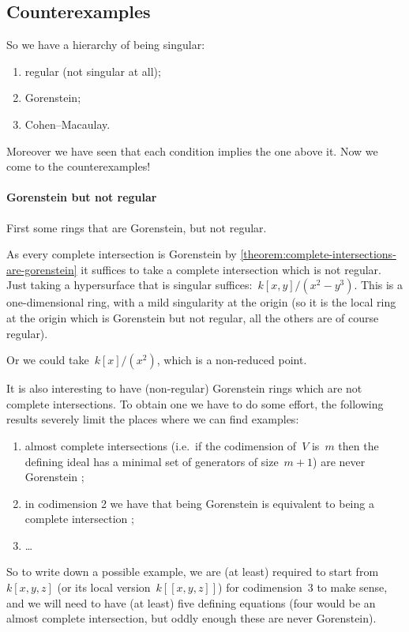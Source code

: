 \documentclass[10pt,a4paper]{article}
\begin{document}
\subsection{Counterexamples}
So we have a hierarchy of being singular:
\begin{enumerate}
  \item regular (not singular at all);
  \item Gorenstein;
  \item Cohen--Macaulay.
\end{enumerate}
Moreover we have seen that each condition implies the one above it. Now we come to the counterexamples!

\paragraph{Gorenstein but not regular}
First some rings that are Gorenstein, but not regular.
\begin{example}
  As every complete intersection is Gorenstein by \cref{theorem:complete-intersections-are-gorenstein} it suffices to take a complete intersection which is not regular. Just taking a hypersurface that is singular suffices:~$k[x,y]/(x^2-y^3)$. This is a one-dimensional ring, with a mild singularity at the origin (so it is the local ring at the origin which is Gorenstein but not regular, all the others are of course regular).
  
  Or we could take~$k[x]/(x^2)$, which is a non-reduced point.
\end{example}
It is also interesting to have (non-regular) Gorenstein rings which are not complete intersections. To obtain one we have to do some effort, the following results severely limit the places where we can find examples:
\begin{enumerate}
  \item almost complete intersections (i.e.\ if the codimension of~$V$ is~$m$ then the defining ideal has a minimal set of generators of size~$m+1$) are never Gorenstein \addreference;
  \item in codimension 2 we have that being Gorenstein is equivalent to being a complete intersection \cite[corollary 21.20]{eisenbud-commutative-algebra};
  \item \ldots
\end{enumerate}
So to write down a possible example, we are (at least) required to start from~$k[x,y,z]$ (or its local version~$k[[x,y,z]]$) for codimension~$3$ to make sense, and we will need to have (at least) five defining equations (four would be an almost complete intersection, but oddly enough these are never Gorenstein).
\end{document}
